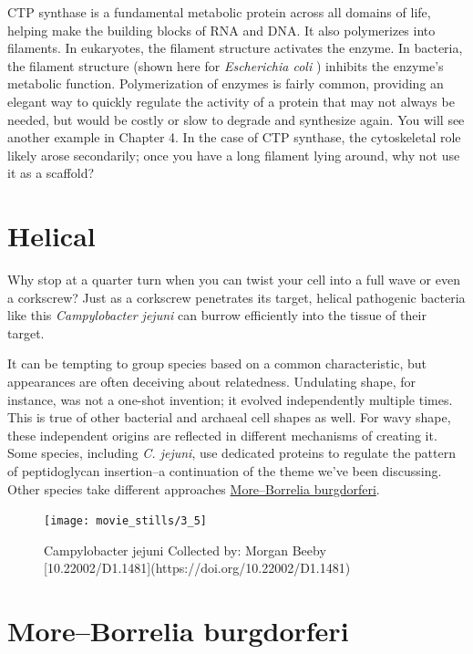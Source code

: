 \documentclass[]{tufte-book}
\begin{document}
CTP synthase is a fundamental metabolic protein across all domains of
life, helping make the building blocks of RNA and DNA. It also
polymerizes into filaments. In eukaryotes, the filament structure
activates the enzyme. In bacteria, the filament structure (shown here
for \emph{Escherichia coli} \citet{lynch2017}) inhibits the enzyme's
metabolic function. Polymerization of enzymes is fairly common,
providing an elegant way to quickly regulate the activity of a protein
that may not always be needed, but would be costly or slow to degrade
and synthesize again. You will see another example in Chapter 4. In the
case of CTP synthase, the cytoskeletal role likely arose secondarily;
once you have a long filament lying around, why not use it as a
scaffold?

\section{Helical}\label{helical}

Why stop at a quarter turn when you can twist your cell into a full wave
or even a corkscrew? Just as a corkscrew penetrates its target, helical
pathogenic bacteria like this \emph{Campylobacter jejuni} can burrow
efficiently into the tissue of their target.

It can be tempting to group species based on a common characteristic,
but appearances are often deceiving about relatedness. Undulating shape,
for instance, was not a one-shot invention; it evolved independently
multiple times. This is true of other bacterial and archaeal cell shapes
as well. For wavy shape, these independent origins are reflected in
different mechanisms of creating it. Some species, including \emph{C.
jejuni}, use dedicated proteins to regulate the pattern of peptidoglycan
insertion--a continuation of the theme we've been discussing. Other
species take different approaches
\protect\hyperlink{moreborrelia-burgdorferi}{More--Borrelia
burgdorferi}.

\begin{figure}
\texttt{[image: movie\_stills/3\_5]} \caption[Campylobacter jejuni Collected by]{Campylobacter jejuni Collected by: Morgan Beeby [10.22002/D1.1481](https://doi.org/10.22002/D1.1481)}\label{fig:unnamed-chunk-52}
\end{figure}

\hypertarget{moreborrelia-burgdorferi}{\section{More--Borrelia
burgdorferi}\label{moreborrelia-burgdorferi}}
\end{document}
